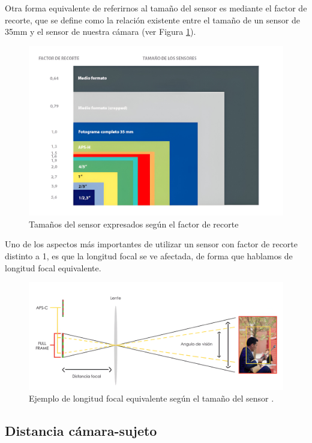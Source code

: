 Otra forma equivalente de referirnos al tamaño del sensor es mediante el factor de recorte, que se define como la relación existente entre el tamaño de un sensor de 35mm y el sensor de nuestra cámara (ver Figura \ref{fig11}).

\begin{figure}[h]
	\centering
	\includegraphics[scale=0.1]{imagenes/cap2/tam_sensor_factor.jpeg}
	\caption{Tamaños del sensor expresados según el factor de recorte}
	\label{fig11}
\end{figure}

Uno de los aspectos más importantes de utilizar un sensor con factor de recorte distinto a 1, es que la longitud focal se ve afectada, de forma que hablamos de longitud focal equivalente.


\begin{figure}[h]
	\centering
	\includegraphics[scale=0.13]{imagenes/cap2/focal-equivalente.png}
	\caption{Ejemplo de longitud focal equivalente según el tamaño del sensor \cite{46}.}
	\label{fig12}
\end{figure}


\subsection*{Distancia cámara-sujeto}

